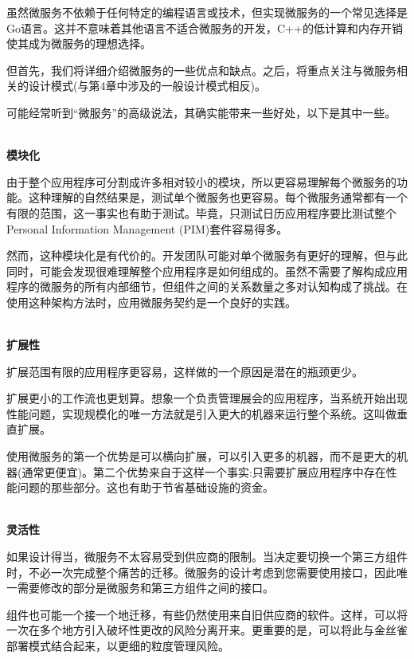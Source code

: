 

虽然微服务不依赖于任何特定的编程语言或技术，但实现微服务的一个常见选择是Go语言。这并不意味着其他语言不适合微服务的开发，C++的低计算和内存开销使其成为微服务的理想选择。 

但首先，我们将详细介绍微服务的一些优点和缺点。之后，将重点关注与微服务相关的设计模式(与第4章中涉及的一般设计模式相反)。


可能经常听到“微服务”的高级说法，其确实能带来一些好处，以下是其中一些。

\hspace*{\fill} \\ %
\noindent
\textbf{模块化}

由于整个应用程序可分割成许多相对较小的模块，所以更容易理解每个微服务的功能。这种理解的自然结果是，测试单个微服务也更容易。每个微服务通常都有一个有限的范围，这一事实也有助于测试。毕竟，只测试日历应用程序要比测试整个Personal Information Management (PIM)套件容易得多。

然而，这种模块化是有代价的。开发团队可能对单个微服务有更好的理解，但与此同时，可能会发现很难理解整个应用程序是如何组成的。虽然不需要了解构成应用程序的微服务的所有内部细节，但组件之间的关系数量之多对认知构成了挑战。在使用这种架构方法时，应用微服务契约是一个良好的实践。

\hspace*{\fill} \\ %
\noindent
\textbf{扩展性}

扩展范围有限的应用程序更容易，这样做的一个原因是潜在的瓶颈更少。

扩展更小的工作流也更划算。想象一个负责管理展会的应用程序，当系统开始出现性能问题，实现规模化的唯一方法就是引入更大的机器来运行整个系统。这叫做垂直扩展。

使用微服务的第一个优势是可以横向扩展，可以引入更多的机器，而不是更大的机器(通常更便宜)。第二个优势来自于这样一个事实:只需要扩展应用程序中存在性能问题的那些部分。这也有助于节省基础设施的资金。

\hspace*{\fill} \\ %
\noindent
\textbf{灵活性}

如果设计得当，微服务不太容易受到供应商的限制。当决定要切换一个第三方组件时，不必一次完成整个痛苦的迁移。微服务的设计考虑到您需要使用接口，因此唯一需要修改的部分是微服务和第三方组件之间的接口。

组件也可能一个接一个地迁移，有些仍然使用来自旧供应商的软件。这样，可以将一次在多个地方引入破坏性更改的风险分离开来。更重要的是，可以将此与金丝雀部署模式结合起来，以更细的粒度管理风险。

